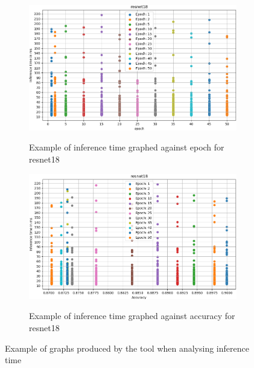 \begin{figure}[h]
\centering
     \begin{subfigure}[b]{0.5\textwidth}
	    \includegraphics[width = \gw cm]{img/epoch_inferencetime.png}
	    \caption[Example of inference time over epoch]{Example of inference time graphed against epoch for resnet18}{\centering}
	    \label{fig:inference_epo_graph}
     \end{subfigure}
     \begin{subfigure}[b]{0.5\textwidth}
	    \includegraphics[width = \gw cm]{img/accuracy_inferencetime.png}
	    \caption[Example of inference time over accuracy]{Example of inference time graphed against accuracy for resnet18}{\centering}
	    \label{fig:inference_acc_graph}
     \end{subfigure}
        \caption{Example of graphs produced by the tool when analysing inference time}
        \label{fig:infere_graph}
\end{figure}


